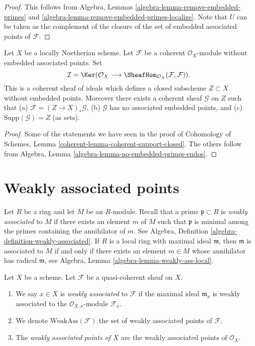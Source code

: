 \begin{proof}
This follows from
Algebra, Lemmas \ref{algebra-lemma-remove-embedded-primes} and
\ref{algebra-lemma-remove-embedded-primes-localize}.
Note that $U$ can be taken as the complement of the closure
of the set of embedded associated points of $\mathcal{F}$.
\end{proof}

\begin{lemma}
\label{lemma-no-embedded-points-endos}
Let $X$ be a locally Noetherian scheme.
Let $\mathcal{F}$ be a coherent $\mathcal{O}_X$-module
without embedded associated points. Set
$$
\mathcal{I}
=
\Ker(\mathcal{O}_X
\longrightarrow
\SheafHom_{\mathcal{O}_X}(\mathcal{F}, \mathcal{F})).
$$
This is a coherent sheaf of ideals which defines a closed
subscheme $Z \subset X$ without embedded points. Moreover
there exists a coherent sheaf $\mathcal{G}$ on $Z$
such that (a) $\mathcal{F} = (Z \to X)_*\mathcal{G}$,
(b) $\mathcal{G}$ has no associated embedded points, and
(c) $\text{Supp}(\mathcal{G}) = Z$ (as sets).
\end{lemma}

\begin{proof}
Some of the statements we have seen in the proof of
Cohomology of Schemes, Lemma \ref{coherent-lemma-coherent-support-closed}.
The others follow from
Algebra, Lemma \ref{algebra-lemma-no-embedded-primes-endos}.
\end{proof}



\section{Weakly associated points}
\label{section-weakly-associated}

\noindent
Let $R$ be a ring and let $M$ be an $R$-module.
Recall that a prime $\mathfrak p \subset R$ is {\it weakly associated}
to $M$ if there exists an element $m$ of $M$ such that $\mathfrak p$ is
minimal among the primes containing the annihilator of $m$. See
Algebra, Definition \ref{algebra-definition-weakly-associated}.
If $R$ is a local ring with maximal ideal $\mathfrak m$, then
$\mathfrak m$ is associated to $M$ if and only if there exists an
element $m \in M$ whose annihilator has radical $\mathfrak m$, see
Algebra, Lemma \ref{algebra-lemma-weakly-ass-local}.

\begin{definition}
\label{definition-weakly-associated}
Let $X$ be a scheme.
Let $\mathcal{F}$ be a quasi-coherent sheaf on $X$.
\begin{enumerate}
\item We say $x \in X$ is {\it weakly associated} to $\mathcal{F}$
if the maximal ideal $\mathfrak m_x$ is weakly associated to the
$\mathcal{O}_{X, x}$-module $\mathcal{F}_x$.
\item We denote $\text{WeakAss}(\mathcal{F})$ the set of weakly associated
points of $\mathcal{F}$.
\item The {\it weakly associated points of $X$} are the weakly associated
points of $\mathcal{O}_X$.
\end{enumerate}
\end{definition}

